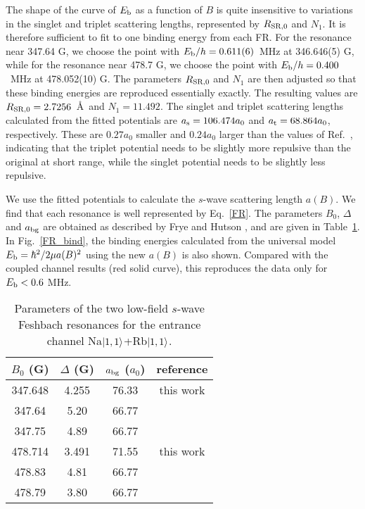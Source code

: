 The shape of the curve of $E_{\rm b}$ as a function of $B$ is quite insensitive to variations in the singlet and triplet scattering lengths, represented by $R_{{\rm SR},0}$ and $N_1$. It is therefore sufficient to fit to one binding energy from each FR. For the resonance near 347.64 G, we choose the point with $E_{\rm b}/h = 0.611(6)$~MHz at 346.646(5) G, while for the resonance near 478.7 G, we choose the point with $E_{\rm b}/h = 0.400$~MHz at 478.052(10) G. The parameters $R_{{\rm SR},0}$ and $N_1$ are then adjusted so that these binding energies are reproduced essentially exactly. The resulting values are $R_{{\rm SR},0}=2.7256$~\AA\ and $N_1=11.492$. The singlet and triplet scattering lengths calculated from the fitted potentials are  $a_{\rm s} = 106.474 a_0$ and $a_{\rm t} = 68.864 a_0$, respectively. These are $0.27 a_0$ smaller and $0.24 a_0$ larger than the values of Ref.\ \cite{wang2013observation}, indicating that the triplet potential needs to be slightly more repulsive than the original at short range, while the singlet potential needs to be slightly less repulsive.

We use the fitted potentials to calculate the $s$-wave scattering length $a(B)$. We find that each resonance is well represented by Eq.~\ref{FR}. The parameters $B_{0}$, $\Delta$ and $a_{\rm bg}$ are obtained as described by Frye and Hutson \cite{Frye2017}, and are given in Table~\ref{tab1}. In Fig.~\ref{FR_bind}, the binding energies calculated from the universal model $E_{\rm b} = \hbar^2/2\mu a(B)^2$ using the new $a(B)$ is also shown. Compared with the coupled channel results (red solid curve), this reproduces the data only for $E_{\rm b}< 0.6$ MHz. 

\begin{table}[htb]
\caption{Parameters of the two low-field $s$-wave Feshbach resonances for the entrance channel Na$\ket{1,1}$+Rb$\ket{1,1}$.}
\label{tab1}\centering
\begin{tabular}{ c | c | c | c }
\hline\hline
$B_0$ (G) & $\Delta$ (G) & $a_{\rm bg}$ ($a_0$) & reference\\
\hline
347.648 & 4.255  & 76.33 & this work\\
347.64 & 5.20  & 66.77 & \cite{wang2015formation}\\
347.75 & 4.89  & 66.77 & \cite{wang2013observation}\\
\hline
478.714 & 3.491  & 71.55 & this work\\
478.83 & 4.81  & 66.77 & \cite{wang2015formation}\\
478.79 & 3.80  & 66.77 & \cite{wang2013observation}\\
\hline \hline
\end{tabular}
\end{table}

